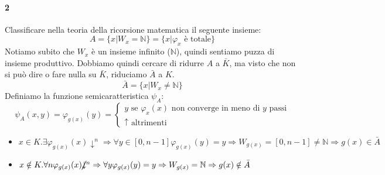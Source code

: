 \documentclass[a4paper,oneside]{scrbook}
\begin{document}
\paragraph{2} Classificare nella teoria della ricorsione matematica il seguente insieme:
\begin{equation*}
    A=\{x|W_x=\mathbb{N}\}=\{x|\varphi_x \text{ è totale}\}
\end{equation*}
Notiamo subito che $W_x$ è un insieme infinito ($\mathbb{N}$), quindi sentiamo puzza di insieme produttivo. Dobbiamo quindi cercare di ridurre $A$ a $\bar{K}$, ma visto
che non si può dire o fare nulla su $\bar{K}$, riduciamo $\bar{A}$ a $K$.
$$\bar{A}=\{x|W_x\ne \mathbb{N}\}$$
Definiamo la funzione semicaratteristica $\psi_A$:
\begin{equation*}
    \psi_A(x,y)=
    \varphi_{g(x)}(y)=
    \begin{cases}
        y \text{ se } \varphi_x(x) \text{ non converge in meno di $y$ passi}\\
        \uparrow \text{ altrimenti}
    \end{cases}
\end{equation*}
\begin{itemize}
    \item $x\in K.\exists \varphi_{g(x)}(x)\downarrow^n \Rightarrow \forall y \in [0,n-1] \varphi_{g(x)}(y)=y \Rightarrow W_{g(x)}=[0,n-1]\ne \mathbb{N} \Rightarrow g(x) \in \bar{A}$
    \item $x\notin K.\forall n \varphi_{g(x)}(x)\cancel{\downarrow}^n \Rightarrow \forall y \varphi_{g(x)}(y)=y \Rightarrow W_{g(x)}=\mathbb{N} \Rightarrow g(x) \notin \bar{A}$ 
\end{itemize}
\end{document}
